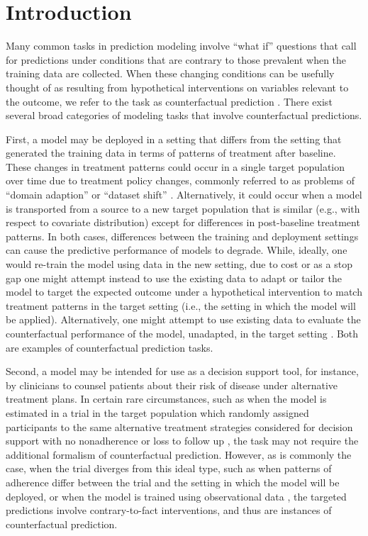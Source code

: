 \section{Introduction} \label{sec:introduction}
Many common tasks in prediction modeling involve ``what if'' questions that call for predictions under conditions that are contrary to those prevalent when the training data are collected. When these changing conditions can be usefully thought of as resulting from  hypothetical interventions on variables relevant to the outcome, we refer to the task as counterfactual prediction \cite{hernan_second_2019,dickerman_counterfactual_2020,van_geloven_prediction_2020}. There exist several broad categories of modeling tasks that involve counterfactual predictions. 

First, a model may be deployed in a setting that differs from the setting that generated the training data in terms of patterns of treatment after baseline. These changes in treatment patterns could occur in a single target population over time due to treatment policy changes, commonly referred to as problems of ``domain adaption'' or ``dataset shift''  \cite{finlayson_clinician_2021, subbaswamy_development_2020}. Alternatively, it could occur when a model is transported from a source to a new target population that is similar (e.g., with respect to covariate distribution) except for differences in post-baseline treatment patterns. In both cases, differences between the training and deployment settings can cause the predictive performance of models to degrade. While, ideally, one would re-train the model using data in the new setting, due to cost or as a stop gap one might attempt instead to use the existing data to adapt or tailor the model to target the expected outcome under a hypothetical intervention to match treatment patterns in the target setting (i.e., the setting in which the model will be applied). Alternatively, one might attempt to use existing data to evaluate the counterfactual performance of the model, unadapted, in the target setting \cite{pajouheshnia_accounting_2017}. Both are examples of counterfactual prediction tasks.

Second, a model may be intended for use as a decision support tool, for instance, by clinicians to counsel patients about their risk of disease under alternative treatment plans. In certain rare circumstances, such as when the model is estimated in a trial in the target population which randomly assigned participants to the same alternative treatment strategies considered for decision support with no nonadherence or loss to follow up \cite{glasziou_evidence_1995,dahabreh_using_2016,kent_personalized_2018,kent_predictive_2020,hoogland_tutorial_2021}, the task may not require the additional formalism of counterfactual prediction. However, as is commonly the case, when the trial diverges from this ideal type, such as when patterns of adherence differ between the trial and the setting in which the model will be deployed, or when the model is trained using observational data \cite{schulam_reliable_2017-1,dickerman_counterfactual_2020}, the targeted predictions involve contrary-to-fact interventions, and thus are instances of counterfactual prediction.

